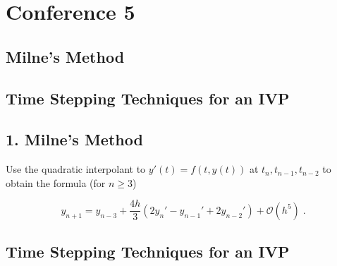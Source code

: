 \documentclass[a4paper]{article}
\begin{document}
\section*{Conference 5}
\subsection*{Milne's Method}
\subsection*{Time Stepping Techniques for an IVP}

\newpage

\subsection*{1. Milne's Method}

Use the quadratic interpolant to $y'(t) = f(t,y(t))$ at $t_n,t_{n-1}, t_{n-2}$ to obtain the formula (for $n\geq 3$)

$$ y_{n+1} = y_{n-3} + \frac{4h}{3}\left(2y_n' - y_{n-1}' + 2y_{n-2}' \right) + \mathcal{O}(h^5) \;. $$

\newpage

\subsection*{Time Stepping Techniques for an IVP}
\end{document}
